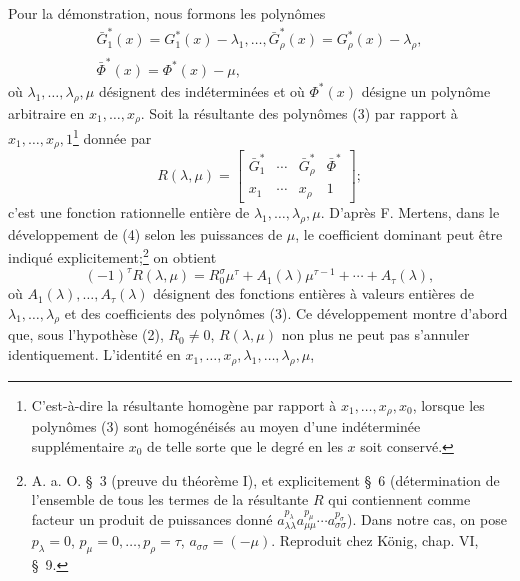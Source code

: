 Pour la démonstration, nous formons les polynômes
\begin{equation}
\begin{gathered}
  \bar G_1^*(x)=G_1^*(x)-\lambda_1,
  \ldots,
  \bar G_\rho^*(x)=G_\rho^*(x)-\lambda_\rho,\\
  \bar\Phi^*(x)=\Phi^*(x)-\mu,
\end{gathered}
\tag{3}
\end{equation}
où $\lambda_1,\ldots,\lambda_\rho,\mu$ désignent des indéterminées et où $\Phi^*(x)$ désigne un polynôme arbitraire en $x_1,\ldots,x_\rho$. Soit la résultante des polynômes (3) par rapport à $x_1,\ldots,x_\rho,1$\footnote{C'est-à-dire la résultante homogène par rapport à $x_1,\ldots,x_\rho,x_0$, lorsque les polynômes (3) sont homogénéisés au moyen d'une indéterminée supplémentaire $x_0$ de telle sorte que le degré en les $x$ soit conservé.} donnée par
\begin{equation}
  R(\lambda,\mu)=\left[
  \begin{array}{cccc}
   \bar G_1^*&\cdots&\bar G_\rho^*&\bar\Phi^*\\
   x_1&\cdots&x_\rho&1
  \end{array}
  \right];
\tag{4}
\end{equation}
c'est une fonction rationnelle entière de $\lambda_1,\ldots,\lambda_\rho,\mu$. D'après F. Mertens, dans le développement de (4) selon les puissances de $\mu$, le coefficient dominant peut être indiqué explicitement;\footnote{A. a. O. \S\ 3 (preuve du théorème I), et explicitement \S\ 6 (détermination de l'ensemble de tous les termes de la résultante $R$ qui contiennent comme facteur un produit de puissances donné $a_{\lambda\lambda}^{p_\lambda}a_{\mu\mu}^{p_\mu}\cdots a_{\sigma\sigma}^{p_\sigma}$). Dans notre cas, on pose $p_\lambda=0$, $p_\mu=0,\ldots,p_\rho=\tau$, $a_{\sigma\sigma}=(-\mu)$. Reproduit chez König, chap. VI, \S\ 9.} on obtient
\begin{equation}
  (-1)^\tau R(\lambda,\mu)
  =R_0^\sigma\mu^\tau+A_1(\lambda)\mu^{\tau-1}+\cdots+A_\tau(\lambda),
\tag{5}
\end{equation}
où $A_1(\lambda),\ldots,A_\tau(\lambda)$ désignent des fonctions entières à valeurs entières de $\lambda_1,\ldots,\lambda_\rho$ et des coefficients des polynômes (3). Ce développement montre d'abord que, sous l'hypothèse (2), $R_0\ne0$, $R(\lambda,\mu)$ non plus ne peut pas s'annuler identiquement. L'identité en $x_1,\ldots,x_\rho,\lambda_1,\ldots,\lambda_\rho,\mu$,
